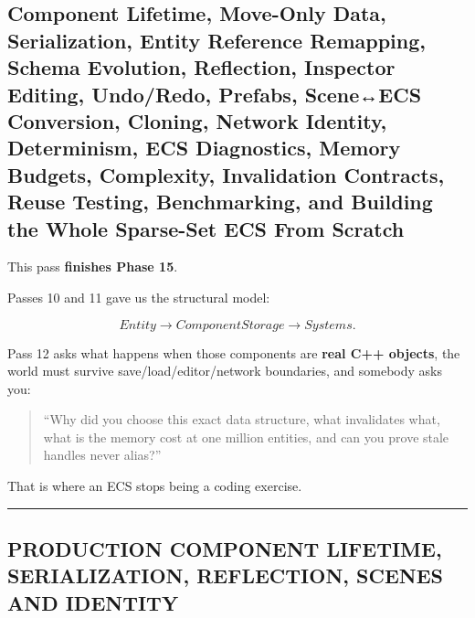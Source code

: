 \subsection{Component Lifetime, Move-Only Data, Serialization, Entity Reference Remapping, Schema Evolution, Reflection, Inspector Editing, Undo/Redo, Prefabs, Scene↔ECS Conversion, Cloning, Network Identity, Determinism, ECS Diagnostics, Memory Budgets, Complexity, Invalidation Contracts, Reuse Testing, Benchmarking, and Building the Whole Sparse-Set ECS From Scratch}\label{05-engine-i-ch017-component-lifetime-move-only-data-serialization-entity-reference-remapping-schema-evolution-reflection-inspector-editing-undoredo-prefabs-sceneecs-conversion-cloning-network-identity-determinism-ecs-diagnostics-memory-budgets-complexity-invalidation-contracts-reuse-testing-benchmarking-and-building-the-whole-sparse-set-ecs-from-scratch}

\hypertarget{05-engine-i-ch017-component-lifetime-move-only-data-serialization-entity-reference-remapping-schema-evolution-reflection-inspector-editing-undoredo-prefabs-sceneecs-conversion-cloning-network-identity-determinism-ecs-diagnostics-memory-budgets-complexity-invalidation-contracts-reuse-testing-benchmarking-and-building-the-whole-sparse-set-ecs-from-scratch}{}

This pass \textbf{finishes Phase 15}.

Passes 10 and 11 gave us the structural model:

\[
Entity
\rightarrow
ComponentStorage
\rightarrow
Systems.
\]

Pass 12 asks what happens when those components are \textbf{real C++ objects}, the world must survive save/load/editor/network boundaries, and somebody asks you:

\begin{quote}
``Why did you choose this exact data structure, what invalidates what, what is the memory cost at one million entities, and can you prove stale handles never alias?''
\end{quote}

That is where an ECS stops being a coding exercise.

\begin{center}\rule{0.5\linewidth}{0.5pt}\end{center}

\subsection{PRODUCTION COMPONENT LIFETIME, SERIALIZATION, REFLECTION, SCENES AND IDENTITY}\label{05-engine-i-ch017-production-component-lifetime-serialization-reflection-scenes-and-identity}

